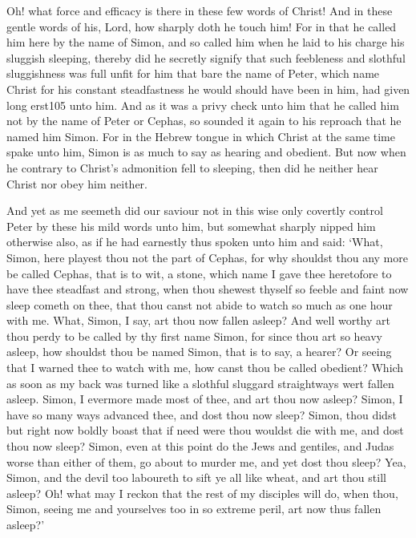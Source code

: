 \documentclass[a5paper]{scrbook}
\begin{document}
	Oh! what force and efficacy is there in these few words of Christ! And in these gentle words of his, Lord, how sharply doth he touch him! For in that he called him here by the name of Simon, and so called him when he laid to his charge his sluggish sleeping, thereby did he secretly signify that such feebleness and slothful sluggishness was full unfit for him that bare the name of Peter, which name Christ for his constant steadfastness he would should have been in him, had given long erst105 unto him. And as it was a privy check unto him that he called him not by the name of Peter or Cephas, so sounded it again to his reproach that he named him Simon. For in the Hebrew tongue in which Christ at the same time spake unto him, Simon is as much to say as hearing and obedient. But now when he contrary to Christ's admonition fell to sleeping, then did he neither hear Christ nor obey him neither.
	
	And yet as me seemeth did our saviour not in this wise only covertly control Peter by these his mild words unto him, but somewhat sharply nipped him otherwise also, as if he had earnestly thus spoken unto him and said: ‘What, Simon, here playest thou not the part of Cephas, for why shouldst thou any more be called Cephas, that is to wit, a stone, which name I gave thee heretofore to have thee steadfast and strong, when thou shewest thyself so feeble and faint now sleep cometh on thee, that thou canst not abide to watch so much as one hour with me. What, Simon, I say, art thou now fallen asleep? And well worthy art thou perdy to be called by thy first name Simon, for since thou art so heavy asleep, how shouldst thou be named Simon, that is to say, a hearer? Or seeing that I warned thee to watch with me, how canst thou be called obedient? Which as soon as my back was turned like a slothful sluggard straightways wert fallen asleep. Simon, I evermore made most of thee, and art thou now asleep? Simon, I have so many ways advanced thee, and dost thou now sleep? Simon, thou didst but right now boldly boast that if need were thou wouldst die with me, and dost thou now sleep? Simon, even at this point do the Jews and gentiles, and Judas worse than either of them, go about to murder me, and yet dost thou sleep? Yea, Simon, and the devil too laboureth to sift ye all like wheat, and art thou still asleep? Oh! what may I reckon that the rest of my disciples will do, when thou, Simon, seeing me and yourselves too in so extreme peril, art now thus fallen asleep?’
	
\end{document}
